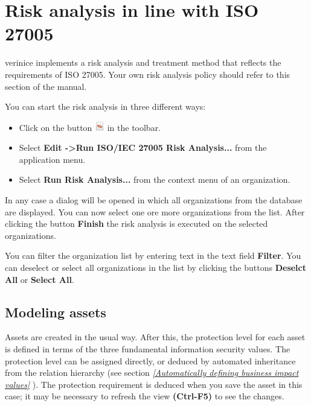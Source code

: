 \documentclass[a4paper,10pt]{book}
\begin{document}
\section{Risk analysis in line with ISO 27005}
\label{sec:risk-assessment-iso-27005}
verinice implements a risk analysis and treatment method that reflects the requirements of ISO 27005. Your own risk analysis policy should refer to this section of the manual.

You can start the risk analysis in three different ways:
\begin{itemize}
 \item Click on the button \includegraphics[height=2ex]{Icon/16-paper-calculate-percent.png} in the toolbar.
 \item Select \textbf {Edit -\textgreater Run ISO/IEC 27005 Risk Analysis...} from the application menu.
 \item Select \textbf {Run Risk Analysis...} from the context menu of an organization.
\end{itemize}

In any case a dialog will be opened in which all organizations from the database are displayed. You can now select one ore more organizations from the list. After clicking the button \textbf {Finish} the risk analysis is executed on the selected organizations.

You can filter the organization list by entering text in the text field \textbf {Filter}. You can deselect or select all organizations in the list by clicking the buttons \textbf {Deselct All} or \textbf {Select All}.


\subsection{Modeling assets}
Assets are created in the usual way. After this, the protection level for each asset is defined in terms of the three
fundamental information security values. The protection level can be assigned directly, or deduced by automated inheritance
from the relation hierarchy (see section {\em \ref{Automatically defining business impact values} }). The protection requirement is deduced when you save the asset in this case; it may be necessary to refresh the view \textbf{(Ctrl-F5)} to see the changes.
\end{document}
